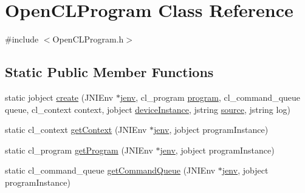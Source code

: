\hypertarget{class_open_c_l_program}{\section{Open\-C\-L\-Program Class Reference}
\label{class_open_c_l_program}
}


{\ttfamily \#include $<$Open\-C\-L\-Program.\-h$>$}

\subsection*{Static Public Member Functions}
\begin{DoxyCompactItemize}
\item 
static jobject \hyperlink{class_open_c_l_program_a702ecb5ce21e3653caf9bdb944370d1e}{create} (J\-N\-I\-Env $\ast$\hyperlink{aparapi_8cpp_a31595c73e9a3750524b2ff61b5a14f96}{jenv}, cl\-\_\-program \hyperlink{aparapi_8cpp_ac70709e80332d58701f9623a803c8541}{program}, cl\-\_\-command\-\_\-queue queue, cl\-\_\-context context, jobject \hyperlink{opencljni_8cpp_a67943048eade3746c8f1743e78343337}{device\-Instance}, jstring \hyperlink{aparapi_8cpp_ab6f02de0fea282662dc1f6ac445ec5f3}{source}, jstring log)
\item 
static cl\-\_\-context \hyperlink{class_open_c_l_program_a26221e4b0762f6f4089194d63fcacc36}{get\-Context} (J\-N\-I\-Env $\ast$\hyperlink{aparapi_8cpp_a31595c73e9a3750524b2ff61b5a14f96}{jenv}, jobject program\-Instance)
\item 
static cl\-\_\-program \hyperlink{class_open_c_l_program_a90852781e4b5ce9c5ad20f388201a274}{get\-Program} (J\-N\-I\-Env $\ast$\hyperlink{aparapi_8cpp_a31595c73e9a3750524b2ff61b5a14f96}{jenv}, jobject program\-Instance)
\item 
static cl\-\_\-command\-\_\-queue \hyperlink{class_open_c_l_program_a66ef9d6495c4a62aeb0cac558abce381}{get\-Command\-Queue} (J\-N\-I\-Env $\ast$\hyperlink{aparapi_8cpp_a31595c73e9a3750524b2ff61b5a14f96}{jenv}, jobject program\-Instance)
\end{DoxyCompactItemize}


